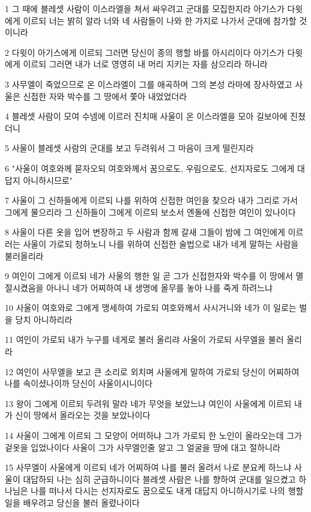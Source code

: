 \par 1 그 때에 블레셋 사람이 이스라엘을 쳐서 싸우려고 군대를 모집한지라 아기스가 다윗에게 이르되 너는 밝히 알라 너와 네 사람들이 나와 한 가지로 나가서 군대에 참가할 것이니라
\par 2 다윗이 아기스에게 이르되 그러면 당신이 종의 행할 바를 아시리이다 아기스가 다윗에게 이르되 그러면 내가 너로 영영히 내 머리 지키는 자를 삼으리라 하니라
\par 3 사무엘이 죽었으므로 온 이스라엘이 그를 애곡하며 그의 본성 라마에 장사하였고 사울은 신접한 자와 박수를 그 땅에서 쫓아 내었었더라
\par 4 블레셋 사람이 모여 수넴에 이르러 진치매 사울이 온 이스라엘을 모아 길보아에 진쳤더니
\par 5 사울이 블레셋 사람의 군대를 보고 두려워서 그 마음이 크게 떨린지라
\par 6 "사울이 여호와께 묻자오되 여호와께서 꿈으로도, 우림으로도, 선지자로도 그에게 대답지 아니하시므로"
\par 7 사울이 그 신하들에게 이르되 나를 위하여 신접한 여인을 찾으라 내가 그리로 가서 그에게 물으리라 그 신하들이 그에게 이르되 보소서 엔돌에 신접한 여인이 있나이다
\par 8 사울이 다른 옷을 입어 변장하고 두 사람과 함께 갈새 그들이 밤에 그 여인에게 이르러는 사울이 가로되 청하노니 나를 위하여 신접한 술법으로 내가 네게 말하는 사람을 불러올리라
\par 9 여인이 그에게 이르되 네가 사울의 행한 일 곧 그가 신접한자와 박수를 이 땅에서 멸절시켰음을 아나니 네가 어찌하여 내 생명에 올무를 놓아 나를 죽게 하려느냐
\par 10 사울이 여호와로 그에게 맹세하여 가로되 여호와께서 사시거니와 네가 이 일로는 벌을 당치 아니하리라
\par 11 여인이 가로되 내가 누구를 네게로 불러 올리랴 사울이 가로되 사무엘을 불러 올리라
\par 12 여인이 사무엘을 보고 큰 소리로 외치며 사울에게 말하여 가로되 당신이 어찌하여 나를 속이셨나이까 당신이 사울이시니이다
\par 13 왕이 그에게 이르되 두려워 말라 네가 무엇을 보았느냐 여인이 사울에게 이르되 내가 신이 땅에서 올라오는 것을 보았나이다
\par 14 사울이 그에게 이르되 그 모양이 어떠하냐 그가 가로되 한 노인이 올라오는데 그가 겉옷을 입었나이다 사울이 그가 사무엘인줄 알고 그 얼굴을 땅에 대고 절하니라
\par 15 사무엘이 사울에게 이르되 네가 어찌하여 나를 불러 올려서 나로 분요케 하느냐 사울이 대답하되 나는 심히 군급하니이다 블레셋 사람은 나를 향하여 군대를 일으켰고 하나님은 나를 떠나서 다시는 선지자로도 꿈으로도 내게 대답지 아니하시기로 나의 행할 일을 배우려고 당신을 불러 올렸나이다
